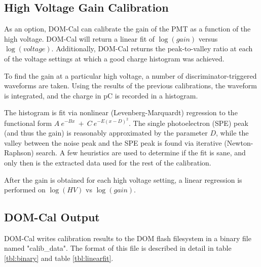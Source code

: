 \documentclass[10pt]{article}
\begin{document}
\subsection{High Voltage Gain Calibration}

As an option, DOM-Cal can calibrate the gain of the PMT as a function of
the high voltage.  DOM-Cal will return a linear fit of $\log(gain)$ versus
$\log(voltage)$.  Additionally, DOM-Cal returns the peak-to-valley ratio at
each of the voltage settings at which a good charge histogram was achieved.  

To find the gain at a particular high voltage, a number of
discriminator-triggered waveforms are taken.  Using the results of the
previous calibrations, the waveform is integrated, and the charge in pC is
recorded in a histogram.

The histogram is fit via nonlinear (Levenberg-Marquardt) regression to the
functional form $A\ e^{-Bx}\ +\ C\ e^{-E(x-D)^2}$.  The single
photoelectron (SPE) peak (and thus the gain) is reasonably approximated by
the parameter $D$, while the valley between the noise peak and the SPE peak
is found via iterative (Newton-Raphson) search.  A few heuristics are used
to determine if the fit is sane, and only then is the extracted data used
for the rest of the calibration.

After the gain is obtained for each high voltage setting, a linear
regression is performed on $\log(HV)$ vs $\log(gain)$.

\subsection{DOM-Cal Output}

DOM-Cal writes calibration results to the DOM flash filesystem in a binary
file named "calib\_data".  The format of this file is described in detail in
table \ref{tbl:binary} and table \ref{tbl:linearfit}.
\end{document}
